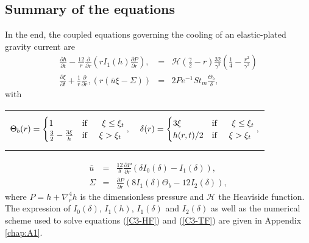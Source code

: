 \subsection{Summary of the equations}
\label{C3-sec:summary-equations}

In  the  end,  the  coupled  equations governing  the  cooling  of  an
elastic-plated gravity current are
\begin{eqnarray}
  \frac{\partial h}{\partial t}-\frac{12}{r}
  \frac{\partial}{\partial      r}
  \left( r I_1(h) \frac{\partial P}{\partial
  r}\right),
  \label{C3-HF}
  & =& \mathcal{H}(\frac{\gamma}{2}-r)\frac{32}{\gamma^{2}}\left(\frac{1}{4}-\frac{r^{2}}{\gamma^{2}}\right)\\
  \frac{\partial                                       \xi}{\partial
  t}+\frac{1}{r}\frac{\partial}{\partial                          r},
  \left( r\left(\bar{u}\xi-\Sigma\right)\right)&=&2Pe^{-1}St_m\frac{\Theta_b}{\delta},\label{C3-TF}
\end{eqnarray}
with

\begin{tabular}{p{6cm}p{6cm}}
{
\begin{equation}
    \Theta_b(r)=
    \begin{cases}
      1 &\text{if } \hspace{.5cm} \xi\leq \xi_t \nonumber\\
      \frac{3}{2}-\frac{3\xi}{h} & \text{if} \hspace{.5cm} \xi > \xi_t\nonumber
    \end{cases},
  \end{equation}
                                   }
&
{
  \begin{equation}
    \delta(r)=
    \begin{cases}
      3\xi &\text{if } \hspace{.5cm} \xi\leq \xi_t\\
      h(r,t)/2 & \text{if} \hspace{.5cm} \xi > \xi_t\nonumber\\
    \end{cases},
  \end{equation}
  }
\end{tabular}
\begin{eqnarray}
  \overline{u}&=& \frac{12}{\delta}\frac{\partial P}{\partial r}\left(\delta
                  I_0(\delta)-I_1(\delta)\right) \label{C3-ubarF},\\
  \Sigma     &=& \frac{\partial     P}{\partial
                 r}\left(8I_1(\delta)\Theta_b-12I_2(\delta)\right),\label{C3-SigmaF}
\end{eqnarray}
where  $P   =  h+\nabla_r^4h$   is  the  dimensionless   pressure  and
$\mathcal{H}$   the    Heaviside   function.    The    expression   of
$I_0(\delta)$, $I_1(h)$,  $I_1(\delta)$ and  $I_2(\delta)$ as  well as
the  numerical  scheme  used  to  solve  equations  (\ref{C3-HF})  and
(\ref{C3-TF}) are given in Appendix \ref{chap:A1}.

